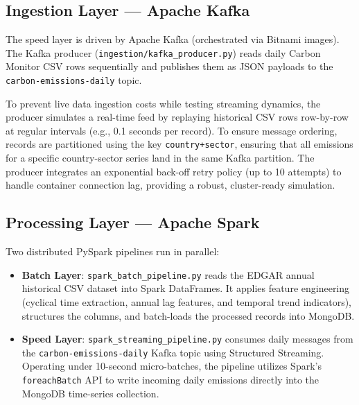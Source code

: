 \documentclass[conference]{IEEEtran}
\begin{document}
\subsection{Ingestion Layer — Apache Kafka}
The speed layer is driven by Apache Kafka (orchestrated via Bitnami images). The Kafka producer (\texttt{ingestion/kafka\_producer.py}) reads daily Carbon Monitor CSV rows sequentially and publishes them as JSON payloads to the \texttt{carbon-emissions-daily} topic. 

To prevent live data ingestion costs while testing streaming dynamics, the producer simulates a real-time feed by replaying historical CSV rows row-by-row at regular intervals (e.g., 0.1 seconds per record). To ensure message ordering, records are partitioned using the key \texttt{country+sector}, ensuring that all emissions for a specific country-sector series land in the same Kafka partition. The producer integrates an exponential back-off retry policy (up to 10 attempts) to handle container connection lag, providing a robust, cluster-ready simulation.

\subsection{Processing Layer — Apache Spark}
Two distributed PySpark pipelines run in parallel:
\begin{itemize}
    \item \textbf{Batch Layer}: \texttt{spark\_batch\_pipeline.py} reads the EDGAR annual historical CSV dataset into Spark DataFrames. It applies feature engineering (cyclical time extraction, annual lag features, and temporal trend indicators), structures the columns, and batch-loads the processed records into MongoDB.
    \item \textbf{Speed Layer}: \texttt{spark\_streaming\_pipeline.py} consumes daily messages from the \texttt{carbon-emissions-daily} Kafka topic using Structured Streaming. Operating under 10-second micro-batches, the pipeline utilizes Spark's \texttt{foreachBatch} API to write incoming daily emissions directly into the MongoDB time-series collection.
\end{itemize}
\end{document}
